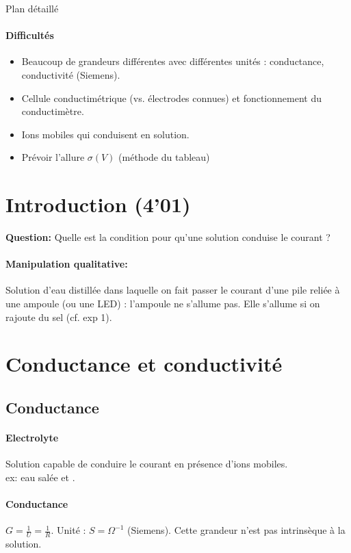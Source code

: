 \begin{reportBlock}{Plan détaillé}
\paragraph*{Difficultés}

\begin{itemize}
\item Beaucoup de grandeurs différentes avec différentes unités : conductance, conductivité (Siemens).
\item Cellule conductimétrique (vs. électrodes connues) et fonctionnement du conductimètre.
\item Ions mobiles qui conduisent en solution.
\item Prévoir l'allure $\sigma(V)$ (méthode du tableau)
\end{itemize}

\section*{Introduction (4'01)}

\textbf{Question:} Quelle est la condition pour qu'une solution conduise le courant ?

\paragraph*{Manipulation qualitative:} Solution d'eau distillée dans laquelle on fait passer le courant d'une pile reliée à une ampoule (ou une LED) : l'ampoule ne s'allume pas. Elle s'allume si on rajoute du sel (cf. exp 1).

\section{Conductance et conductivité}

\subsection{Conductance}

\paragraph*{Electrolyte} Solution capable de conduire le courant en présence d'ions mobiles. \\
ex: eau salée  et .

\paragraph*{Conductance} $G = \frac{1}{U} = \frac{1}{R}$. Unité : $S = \Omega^{-1}$ (Siemens). Cette grandeur n'est pas intrinsèque à la solution.


\end{reportBlock}
